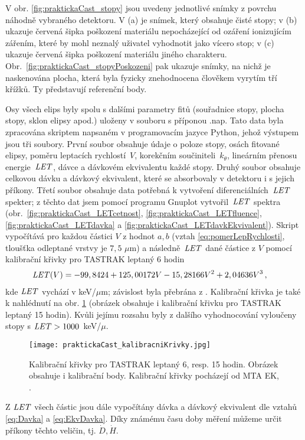 V obr. \ref{fig:praktickaCast_stopy} jsou uvedeny jednotlivé snímky z povrchu náhodně vybraného detektoru. V (a) je snímek, který obsahuje čisté stopy; v (b) ukazuje červená šipka poškození materiálu nepocházející od ozáření ionizujícím zářením, které by mohl neznalý uživatel vyhodnotit jako vícero stop; v (c) ukazuje červená šipka poškození materiálu jiného charakteru. Obr.~\ref{fig:praktickaCast_stopyPoskozeni} pak ukazuje snímky, na nichž je naskenována plocha, která byla fyzicky znehodnocena člověkem vyrytím tří křížků. Ty představují referenční body. 

Osy všech elips byly spolu s dalšími parametry fitů (souřadnice stopy, plocha stopy, sklon elipsy apod.) uloženy v souboru s příponou .nap. Tato data byla zpracována skriptem napsaném v programovacím jazyce Python, jehož výstupem jsou tři soubory. První soubor obsahuje údaje o poloze stopy, osách fitované elipsy, poměru leptacích rychlostí~$V$, korekčním součiniteli~$k_{\theta}$, lineárním přenosu energie~$\mathit{LET}$, dávce a dávkovém ekvivalentu každé stopy. Druhý soubor obsahuje celkovou dávku a dávkový ekvivalent, které se absorbovaly v detektoru i s jejich příkony. Třetí soubor obsahuje data potřebná k vytvoření diferenciálních~$\mathit{LET}$ spekter; z těchto dat jsem pomocí programu Gnuplot vytvořil~$\mathit{LET}$ spektra (obr.~\ref{fig:praktickaCast_LETcetnost}, \ref{fig:praktickaCast_LETfluence},
\ref{fig:praktickaCast_LETdavka} a \ref{fig:praktickaCast_LETdavkEkvivalent}). Skript vypočítává pro každou částici $V$ z hodnot $a,b$ (vztah \eqref{eq:pomerLepRychlosti}, tloušťka odleptané vrstvy je $7,5$
$\mu$m) a následně~$\mathit{LET}$ dané částice z $V$ pomocí kalibrační křivky pro TASTRAK leptaný 6 hodin
\begin{align}
  \mathit{LET}(V) &= -99,8424+125,00172  V-15,28166  V^2+2,04636  V^3\,,\label{eq:kalibracniKrivkaSestHod}
\end{align}
kde $\mathit{LET}$ vychází v keV/$\mu$m; závislost byla přebrána z \cite{ssntd}. Kalibrační křivka je také k nahlédnutí na obr. \ref{fig:praktickaCast_kalibracniKrivky} (obrázek obsahuje i kalibrační křivku pro TASTRAK leptaný 15 hodin). Kvůli jejímu rozsahu byly z dalšího vyhodnocování vyloučeny stopy s $\mathit{LET}>\nobreak1000$~keV/$\mu$.
\begin{figure}[ht]
  \centering
  \texttt{[image: praktickaCast\_kalibracniKrivky.jpg]}
  \caption{Kalibrační křivky pro TASTRAK leptaný 6, resp. 15 hodin. Obrázek obsahuje i kalibrační body. Kalibrační křivky pocházejí od MTA EK, \cite{ssntd}.}
  \label{fig:praktickaCast_kalibracniKrivky}
\end{figure}
Z $\mathit{LET}$ všech částic jsou dále vypočítány dávka a dávkový ekvivalent dle vztahů \eqref{eq:Davka} a \eqref{eq:EkvDavka}. Díky známému času doby měření můžeme určit příkony těchto veličin, tj. $\dot{D}, \dot{H}$.

